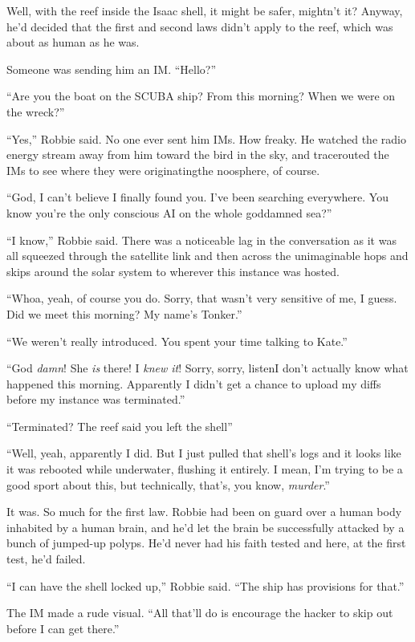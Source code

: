 Well, with the reef inside the Isaac shell, it might be safer,
mightn’t it? Anyway, he’d decided that the first and second laws
didn’t apply to the reef, which was about as human as he was.

Someone was sending him an IM. “Hello?”

“Are you the boat on the SCUBA ship? From this morning? When we
were on the wreck?”

“Yes,” Robbie said. No one ever sent him IMs. How freaky. He
watched the radio energy stream away from him toward the bird in
the sky, and tracerouted the IMs to see where they were
originating\dash{}the noosphere, of course.

“God, I can’t believe I finally found you. I’ve been searching
everywhere. You know you’re the only conscious AI on the whole
goddamned sea?”

“I know,” Robbie said. There was a noticeable lag in the
conversation as it was all squeezed through the satellite link and
then across the unimaginable hops and skips around the solar system
to wherever this instance was hosted.

“Whoa, yeah, of course you do. Sorry, that wasn’t very sensitive of
me, I guess. Did we meet this morning? My name’s Tonker.”

“We weren’t really introduced. You spent your time talking to
Kate.”

“God \emph{damn}! She \emph{is} there! I \emph{knew it}! Sorry,
sorry, listen\dash{}I don’t actually know what happened this morning.
Apparently I didn’t get a chance to upload my diffs before my
instance was terminated.”

“Terminated? The reef said you left the shell\dash{}”

“Well, yeah, apparently I did. But I just pulled that shell’s logs
and it looks like it was rebooted while underwater, flushing it
entirely. I mean, I’m trying to be a good sport about this, but
technically, that’s, you know, \emph{murder}.”

It was. So much for the first law. Robbie had been on guard over a
human body inhabited by a human brain, and he’d let the brain be
successfully attacked by a bunch of jumped-up polyps. He’d never
had his faith tested and here, at the first test, he’d failed.

“I can have the shell locked up,” Robbie said. “The ship has
provisions for that.”

The IM made a rude visual. “All that’ll do is encourage the hacker
to skip out before I can get there.”

